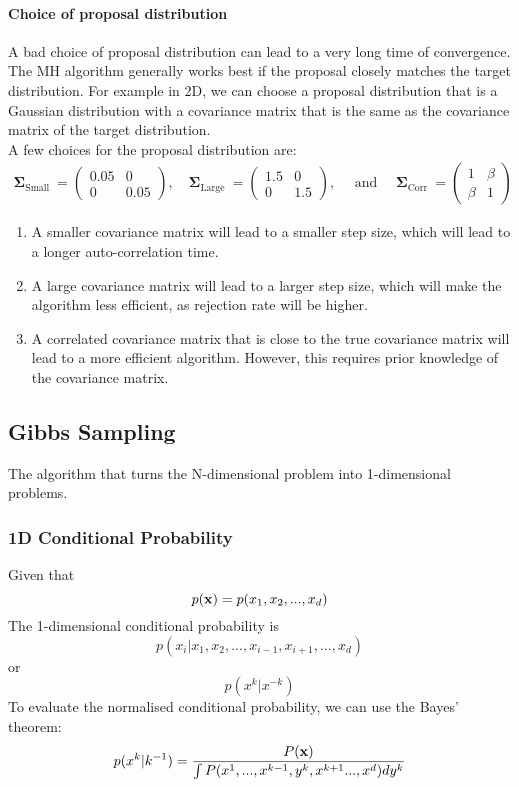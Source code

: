\documentclass[12pt,a4paper]{article}
\begin{document}
\paragraph*{Choice of proposal distribution}
A bad choice of proposal distribution can lead to a very long time of convergence. The MH algorithm generally works best if the proposal closely matches the target distribution. For example in 2D, we can choose a proposal distribution that is a Gaussian distribution with a covariance matrix that is the same as the covariance matrix of the target distribution.\\
A few choices for the proposal distribution are:
\begin{align}
\boldsymbol{\Sigma}_{\text {Small }}=\left(\begin{array}{cc}
0.05 & 0 \\
0 & 0.05
\end{array}\right), \quad \boldsymbol{\Sigma}_{\text {Large }}=\left(\begin{array}{cc}
1.5 & 0 \\
0 & 1.5
\end{array}\right), \quad \text { and } \quad \boldsymbol{\Sigma}_{\text {Corr }}=\left(\begin{array}{ll}
1 & \beta \\
\beta & 1
\end{array}\right)
\end{align}
\begin{enumerate}
    \item A smaller covariance matrix will lead to a smaller step size, which will lead to a longer auto-correlation time.
    \item A large covariance matrix will lead to a larger step size, which will make the algorithm less efficient, as rejection rate will be higher.
    \item A correlated covariance matrix that is close to the true covariance matrix will lead to a more efficient algorithm. However, this requires prior knowledge of the covariance matrix.
\end{enumerate}

\subsection{Gibbs Sampling}
The algorithm that turns the N-dimensional problem into 1-dimensional problems.\\
\subsubsection{1D Conditional Probability}
Given that
$$
p(\vb{x}) = p(x_1, x_2, ..., x_d) 
$$
The 1-dimensional conditional probability is
$$
p(x_i|x_1, x_2, ..., x_{i-1}, x_{i+1}, ..., x_d)
$$
or 
$$
p(x^k|x^{-k})
$$
To evaluate the normalised conditional probability, we can use the Bayes' theorem:
$$
p(x^k|k^{-1}) = \frac{P(\vb{x})}{\int P(x^1,...,x^{k-1},y^k,x^{k+1}...,x^d) dy^k}
$$
\end{document}
